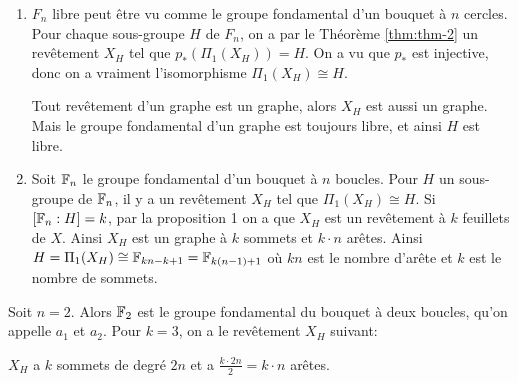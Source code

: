    \begin{preuve}
     \begin{enumerate}
     \item $F_n$ libre peut être vu comme le groupe fondamental d'un bouquet à $n$ cercles. Pour chaque
       sous-groupe $H$ de $F_n$, on a par le Théorème \ref{thm:thm-2} un revêtement $X_H$ tel que
       $p_\ast(\Pi_1(X_H)) = H$. On a vu que $p_\ast$ est injective, donc on a vraiment l'isomorphisme
       $\Pi_1(X_H) \cong H$.

       Tout revêtement d'un graphe est un graphe, alors $X_H$ est aussi un graphe. Mais le groupe fondamental
       d'un graphe est toujours libre, et ainsi $H$ est libre.


     \item Soit $\mathbb{F}_n$ le groupe fondamental d'un bouquet à $n$ boucles. Pour $H$ un sous-groupe de $\mathbb{F}_n$, il
       y a un revêtement $X_H$ tel que $\Pi_1(X_H) \cong H$. Si $[\mathbb{F}_n : H] = k$, par la proposition 1 on a
       que $X_H$ est un revêtement à $k$ feuillets de $X$.
       Ainsi $X_H$ est un graphe à $k$ sommets et $k\cdot n$ arêtes. Ainsi $H = \Pi_1(X_H) \cong \mathbb{F}_{kn-k+1} =
       \mathbb{F}_{k(n-1)+1}$
       où $kn$ est le nombre d'arête et $k$ est le nombre de sommets.
     \end{enumerate}
   \end{preuve}

   \begin{ex}
     Soit $n=2$. Alors $\mathbb{F}_2$ est le groupe fondamental du bouquet à deux boucles, qu'on appelle $a_1$ et
     $a_2$. Pour $k = 3$, on a le revêtement $X_H$ suivant:
     \begin{center}
     \end{center}
     $X_H$ a $k$ sommets de degré $2n$ et a $\frac{k\cdot 2n}{2} = k\cdot n$ arêtes.
   \end{ex}

    
    
    


    
      
  




